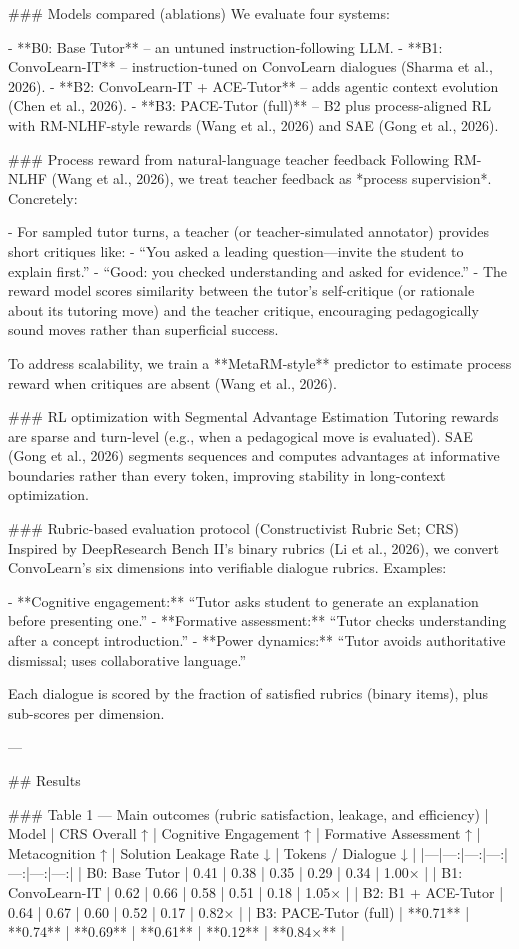 ### Models compared (ablations)  
We evaluate four systems:

- **B0: Base Tutor** – an untuned instruction-following LLM.  
- **B1: ConvoLearn-IT** – instruction-tuned on ConvoLearn dialogues (Sharma et al., 2026).  
- **B2: ConvoLearn-IT + ACE-Tutor** – adds agentic context evolution (Chen et al., 2026).  
- **B3: PACE-Tutor (full)** – B2 plus process-aligned RL with RM-NLHF-style rewards (Wang et al., 2026) and SAE (Gong et al., 2026).

### Process reward from natural-language teacher feedback  
Following RM-NLHF (Wang et al., 2026), we treat teacher feedback as *process supervision*. Concretely:

- For sampled tutor turns, a teacher (or teacher-simulated annotator) provides short critiques like:  
  - “You asked a leading question—invite the student to explain first.”  
  - “Good: you checked understanding and asked for evidence.”  
- The reward model scores similarity between the tutor’s self-critique (or rationale about its tutoring move) and the teacher critique, encouraging pedagogically sound moves rather than superficial success.

To address scalability, we train a **MetaRM-style** predictor to estimate process reward when critiques are absent (Wang et al., 2026).

### RL optimization with Segmental Advantage Estimation  
Tutoring rewards are sparse and turn-level (e.g., when a pedagogical move is evaluated). SAE (Gong et al., 2026) segments sequences and computes advantages at informative boundaries rather than every token, improving stability in long-context optimization.

### Rubric-based evaluation protocol (Constructivist Rubric Set; CRS)  
Inspired by DeepResearch Bench II’s binary rubrics (Li et al., 2026), we convert ConvoLearn’s six dimensions into verifiable dialogue rubrics. Examples:

- **Cognitive engagement:** “Tutor asks student to generate an explanation before presenting one.”  
- **Formative assessment:** “Tutor checks understanding after a concept introduction.”  
- **Power dynamics:** “Tutor avoids authoritative dismissal; uses collaborative language.”  

Each dialogue is scored by the fraction of satisfied rubrics (binary items), plus sub-scores per dimension.

---

## Results  

### Table 1 — Main outcomes (rubric satisfaction, leakage, and efficiency)  
| Model | CRS Overall ↑ | Cognitive Engagement ↑ | Formative Assessment ↑ | Metacognition ↑ | Solution Leakage Rate ↓ | Tokens / Dialogue ↓ |
|---|---:|---:|---:|---:|---:|---:|
| B0: Base Tutor | 0.41 | 0.38 | 0.35 | 0.29 | 0.34 | 1.00× |
| B1: ConvoLearn-IT | 0.62 | 0.66 | 0.58 | 0.51 | 0.18 | 1.05× |
| B2: B1 + ACE-Tutor | 0.64 | 0.67 | 0.60 | 0.52 | 0.17 | 0.82× |
| B3: PACE-Tutor (full) | **0.71** | **0.74** | **0.69** | **0.61** | **0.12** | **0.84×** |


